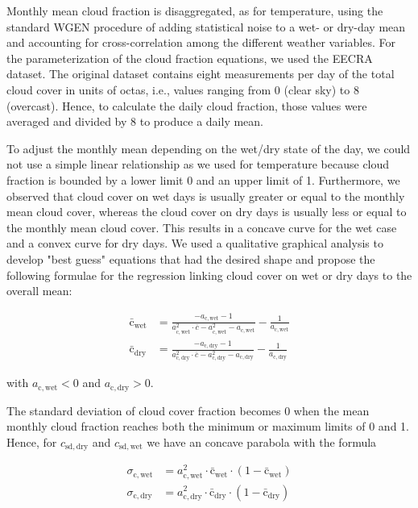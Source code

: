 \begin{refsection}
Monthly mean cloud fraction is disaggregated, as for temperature, using the standard WGEN procedure of adding statistical noise to a wet- or dry-day mean and accounting for cross-correlation among the different weather variables. For the parameterization of the cloud fraction equations, we used the EECRA dataset. The original dataset contains eight measurements per day of the total cloud cover in units of octas, i.e., values ranging from 0 (clear sky) to 8 (overcast). Hence, to calculate the daily cloud fraction, those values were averaged and divided by 8 to produce a daily mean.

To adjust the monthly mean depending on the wet/dry state of the day, we could not use a simple linear relationship as we used for temperature because cloud fraction is bounded by a lower limit 0 and an upper limit of 1. Furthermore, we observed that cloud cover on wet days is usually greater or equal to the monthly mean cloud cover, whereas the cloud cover on dry days is usually less or equal to the monthly mean cloud cover. This results in a concave curve for the wet case and a convex curve for dry days. We used a qualitative graphical analysis to develop "best guess" equations that had the desired shape and propose the following formulae for the regression linking cloud cover on wet or dry days to the overall mean:

\begin{align}
\bar{\mathrm{c}}_\mathrm{wet} &= \frac{-a_{\mathrm{c}, \mathrm{wet}} - 1}{a_{\mathrm{c}, \mathrm{wet}}^2 \cdot \bar{c} - a_{\mathrm{c}, \mathrm{wet}}^2 - a_{\mathrm{c}, \mathrm{wet}}}  - \frac{1}{a_{\mathrm{c}, \mathrm{wet}}} \nonumber \\
\bar{\mathrm{c}}_\mathrm{dry} &= \frac{-a_{\mathrm{c}, \mathrm{dry}} - 1}{a_{\mathrm{c}, \mathrm{dry}}^2 \cdot \bar{c} - a_{\mathrm{c}, \mathrm{dry}}^2 - a_{\mathrm{c}, \mathrm{dry}}}  - \frac{1}{a_{\mathrm{c}, \mathrm{dry}}}
\label{eq:cloud_mean}
\end{align}

with $a_{\mathrm{c}, \mathrm{wet}} < 0$ and $a_{\mathrm{c}, \mathrm{dry}} > 0$.

The standard deviation of cloud cover fraction becomes 0 when the mean monthly cloud fraction reaches both the minimum or maximum limits of 0 and 1. Hence, for $c_\mathrm{sd,dry}$ and $c_\mathrm{sd,wet}$ we have an concave parabola with the formula

\begin{align}
\sigma_{\mathrm{c}, \mathrm{wet}} &= a_{\mathrm{c}, \mathrm{wet}}^2 \cdot \bar{\mathrm{c}}_\mathrm{wet} \cdot (1 - \bar{\mathrm{c}}_\mathrm{wet}) \nonumber \\
\sigma_{\mathrm{c}, \mathrm{dry}} &= a_{\mathrm{c}, \mathrm{dry}}^2 \cdot \bar{\mathrm{c}}_\mathrm{dry} \cdot (1 - \bar{\mathrm{c}}_\mathrm{dry}) \label{eq:cloud_sd}
\end{align}


\end{refsection}

